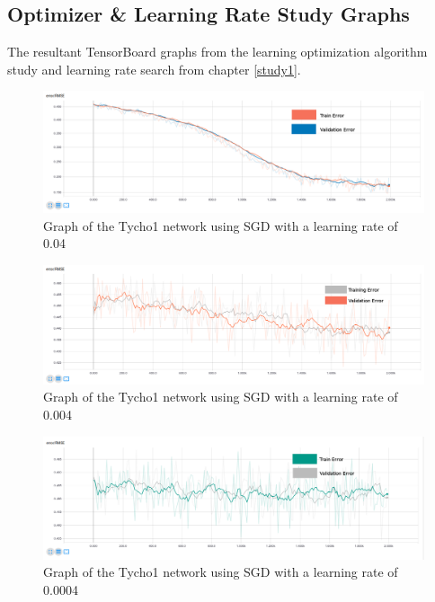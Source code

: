 \documentclass[12pt,a4paper,oneside,oldfontcommands]{memoir}
\begin{document}
\begin{Declaration Of OriginalityOrginality}
\appendix
\chapter{Optimizer \& Learning Rate Study Graphs}

The resultant TensorBoard graphs from the learning optimization algorithm study and learning rate search from chapter \ref{study1}.

\begin{figure}[H]
  \centering
    \includegraphics[width=\linewidth]{graphs/A/tycho_1_SGD_04_sigmoid_train.png}
    \caption{Graph of the Tycho1 network using SGD with a learning rate of 0.04}
\end{figure}

\begin{figure}[H]
  \centering
    \includegraphics[width=\linewidth]{graphs/A/tycho_1_SGD_004_sigmoid.png}
    \caption{Graph of the Tycho1 network using SGD with a learning rate of 0.004}
\end{figure}

\begin{figure}[H]
  \centering
    \includegraphics[width=\linewidth]{graphs/A/tycho_1_SGD_0004_sigmoid.png}
    \caption{Graph of the Tycho1 network using SGD with a learning rate of 0.0004}
\end{figure}


\end{Declaration Of OriginalityOrginality}
\end{document}
